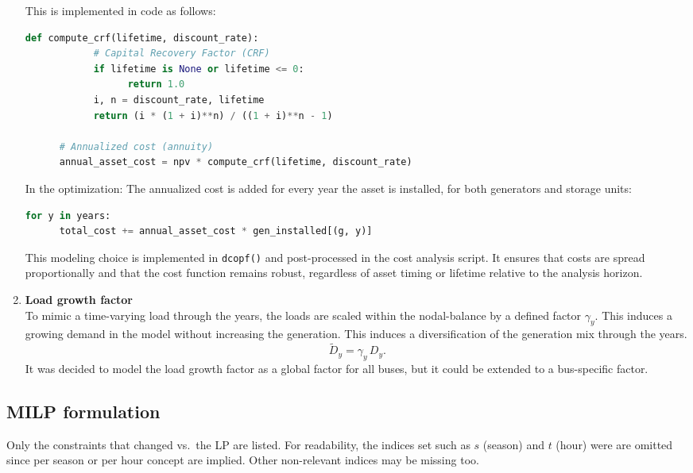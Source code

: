 \begin{enumerate}[label=\textbf{\roman*}.]
      This is implemented in code as follows:
      \begin{lstlisting}[language=Python, numbers=none]
      def compute_crf(lifetime, discount_rate):
            # Capital Recovery Factor (CRF)
            if lifetime is None or lifetime <= 0:
                  return 1.0
            i, n = discount_rate, lifetime
            return (i * (1 + i)**n) / ((1 + i)**n - 1)
      
      # Annualized cost (annuity)
      annual_asset_cost = npv * compute_crf(lifetime, discount_rate)
      \end{lstlisting}

      In the optimization: The annualized cost is added for every year the asset is installed, for both 
      generators and storage units:
      \begin{lstlisting}[language=Python, caption=Objective function cost term]
      for y in years:
      total_cost += annual_asset_cost * gen_installed[(g, y)]
      \end{lstlisting}
      
      This modeling choice is implemented in \texttt{dcopf()} and post-processed in the cost analysis script. It ensures that costs are spread proportionally and that the cost function remains robust, regardless of asset timing or lifetime relative to the analysis horizon.

  \item \textbf{Load growth factor}\\
        To mimic a time-varying load through the years, the loads are scaled within the nodal-balance by a defined 
        factor $\gamma_y$. This induces a growing demand in the model without increasing the generation. 
        This induces a diversification of the generation mix through the years.
        \[
        \tilde D_{y} = \gamma_y\,D_{y}.
        \]
        It was decided to model the load growth factor as a global factor for all buses, but it could be extended to a 
        bus-specific factor.
\end{enumerate}

\newpage
\subsection{MILP formulation}
\label{ssec:MILP_implementation}

Only the constraints that changed vs.\ the LP are listed. For readability, the indices set such as $s$ (season) and $t$ 
(hour) were are omitted since per season or per hour concept are implied. Other non-relevant indices may be missing too.

